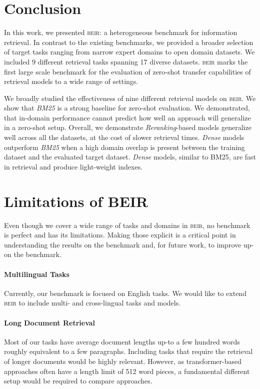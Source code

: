 \documentclass[11pt]{article}
\newcommand{\custo}[1]{\textsc{\normalsize #1}}
\newcommand{\beir}{\custo{beir}\xspace}
\begin{document}
\section{Conclusion}

In this work, we presented \beir: a heterogeneous benchmark for information retrieval. In contrast to the existing benchmarks, we provided a broader selection of target tasks ranging from narrow expert domains to open domain datasets. We included 9 different retrieval tasks spanning 17 diverse datasets. \beir marks the first large scale benchmark for the evaluation of zero-shot transfer capabilities of retrieval models to a wide range of settings.

We broadly studied the effectiveness of nine different retrieval models on \beir. We show that \emph{BM25} is a strong baseline for zero-shot evaluation. We demonstrated, that in-domain performance cannot predict how well an approach will generalize in a zero-shot setup. Overall, we demonstrate \emph{Reranking}-based models generalize well across all the datasets, at the cost of slower retrieval times. \emph{Dense} models outperform \emph{BM25} when a high domain overlap is present between the training dataset and the evaluated target dataset. \emph{Dense} models, similar to BM25, are fast in retrieval and produce light-weight indexes.


\section{Limitations of BEIR}

Even though we cover a wide range of tasks and domains in \beir, no benchmark is perfect and has its limitations. Making those explicit is a critical point in understanding the results on the benchmark and, for future work, to improve up-on the benchmark. 

\paragraph{Multilingual Tasks} Currently, our benchmark is focused on English tasks.  We would like to extend \beir to include multi- and cross-lingual tasks and models.

\paragraph{Long Document Retrieval} Most of our tasks have average document lengths up-to a few hundred words roughly equivalent to a few paragraphs. Including tasks that require the retrieval of longer documents would be highly relevant. However, as transformer-based approaches often have a length limit of 512 word pieces, a fundamental different setup would be required to compare approaches.
\end{document}
